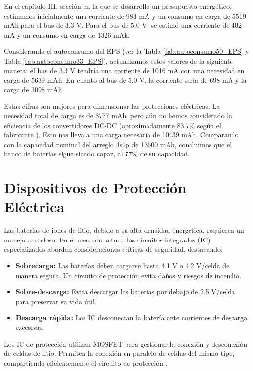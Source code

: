 En el capítulo III, sección en la que se desarrolló un presupuesto energético, estimamos inicialmente una corriente de 983 mA y un consumo en carga de 5519 mAh para el bus de 3.3 V. Para el bus de 5.0 V, se estimó una corriente de 402 mA y un consumo en carga de 1326 mAh.

Considerando el autoconsumo del EPS (ver la Tabla \ref{tab:autoconsumo50_EPS} y Tabla \ref{tab:autoconsumo33_EPS}), actualizamos estos valores de la siguiente manera: el bus de 3.3 V tendría una corriente de 1016 mA con una necesidad en carga de 5639 mAh. En cuanto al bus de 5.0 V, la corriente sería de 698 mA y la carga de 3098 mAh.

Estas cifras son mejores para dimensionar las protecciones eléctricas. La necesidad total de carga es de 8737 mAh, pero aún no hemos considerado la eficiencia de los convertidores DC-DC (aproximadamente 83.7\% según el fabricante \cite{ti_mc34063a}). Esto nos lleva a una carga necesaria de 10439 mAh. Comparando con la capacidad nominal del arreglo 4s1p de 13600 mAh, concluimos que el banco de baterías sigue siendo capaz, al 77\% de su capacidad.



\section{Dispositivos de Protección Eléctrica}

Las baterías de iones de litio, debido a su alta densidad energética, requieren un manejo cauteloso. En el mercado actual, los circuitos integrados (IC) especializados abordan consideraciones críticas de seguridad, destacando:

\begin{itemize}
    \item \textbf{Sobrecarga:} Las baterías deben cargarse hasta 4.1 V o 4.2 V/celda de manera segura. Un circuito de protección evita daños y riesgos de incendio.
    \item \textbf{Sobre-descarga:} Evita descargar las baterías por debajo de 2.5 V/celda para preservar su vida útil.
    \item \textbf{Descarga rápida:} Los IC desconectan la batería ante corrientes de descarga excesivas.
\end{itemize}

Los IC de protección utilizan MOSFET para gestionar la conexión y desconexión de celdas de litio. Permiten la conexión en paralelo de celdas del mismo tipo, compartiendo eficientemente el circuito de protección \cite{knight2015lithium}.

